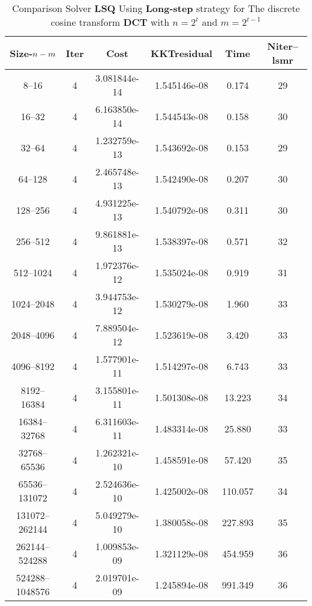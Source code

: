 \documentclass[letterpaper,12pt,oneside,final]{book}
\begin{document}
\begin{table}
\caption{Comparison Solver {\bf LSQ} Using  {\bf Long-step} strategy for  The discrete cosine transform {\bf DCT} with $n=2^{t}$ and $m=2^{t-1}$}  
\begin{center}
\begin{tabular}{|*{6}{c}|} \hline
Size-$n\--m$ & \multicolumn{1}{c}{Iter} & \multicolumn{1}{c}{Cost}& \multicolumn{1}{c}{KKTresidual} & \multicolumn{1}{c}{Time} & \multicolumn{1}{c|}{Niter--lsmr} \\ 
\hline

8--16&      4    &       3.081844e-14&   1.545146e-08&   0.174&   29   \\       
16--32&      4    &       6.163850e-14&   1.544543e-08&   0.158&   30   \\       
32--64&      4    &       1.232759e-13&   1.543692e-08&   0.153&   29   \\       
64--128&      4    &       2.465748e-13&   1.542490e-08&   0.207&   30   \\       
128--256&      4    &       4.931225e-13&   1.540792e-08&   0.311&   30   \\       
256--512&      4    &       9.861881e-13&   1.538397e-08&   0.571&   32   \\       
512--1024&      4    &       1.972376e-12&   1.535024e-08&   0.919&   31   \\       
1024--2048&      4    &       3.944753e-12&   1.530279e-08&   1.960&   33   \\       
2048--4096&      4    &       7.889504e-12&   1.523619e-08&   3.420&   33   \\       
4096--8192&      4    &       1.577901e-11&   1.514297e-08&   6.743&   33   \\       
8192--16384&      4    &       3.155801e-11&   1.501308e-08&   13.223&   34   \\       
16384--32768&      4    &       6.311603e-11&   1.483314e-08&   25.880&   33   \\       
32768--65536&      4    &       1.262321e-10&   1.458591e-08&   57.420&   35   \\       
65536--131072&      4    &       2.524636e-10&   1.425002e-08&   110.057&   34   \\
131072--262144&      4    &       5.049279e-10&   1.380058e-08&   227.893&   35   \\
262144--524288&      4    &       1.009853e-09&   1.321129e-08&   454.959&   36   \\
524288--1048576&      4    &       2.019701e-09&   1.245894e-08&   991.349&   36   \\
\hline
\end{tabular}
\end{center}
\end{table}
\end{document}
